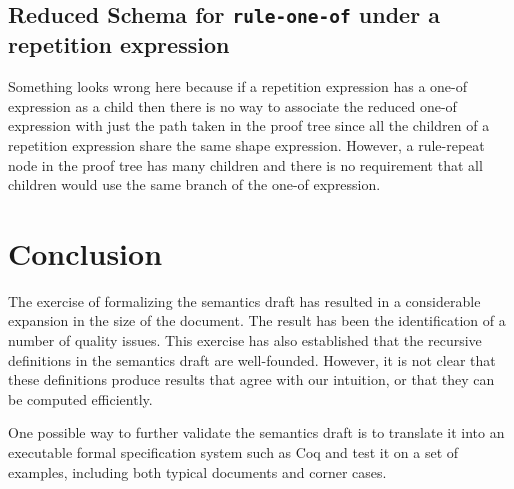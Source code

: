 \documentclass{article}
\begin{document}
\subsection{Reduced Schema for {\tt rule-one-of} under a repetition expression}
Something looks wrong here because if a repetition expression has a one-of expression as a child then there is no way
to associate the reduced one-of expression with just the path taken in the proof tree since all the children of a repetition expression
share the same shape expression. However, a rule-repeat node in the proof tree has many children and there is no requirement
that all children would use the same branch of the one-of expression.

\section{Conclusion}
\label{sec-conclusion}

The exercise of formalizing the semantics draft has resulted in a considerable expansion in the size of the document.
The result has been the identification of a number of quality issues.
This exercise has also established that the recursive definitions in the semantics draft are well-founded.
However, it is not clear that these definitions produce results that agree with our intuition, or that they can be computed efficiently.

One possible way to further validate the semantics draft is to translate it into an executable formal specification system
such as Coq \cite{bertot:coq} and test it on a set of examples, including both typical documents and corner cases.


\end{document}
